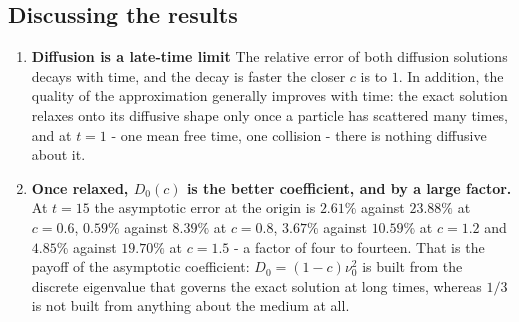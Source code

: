 \documentclass[11pt]{article}
\begin{document}
\subsection*{Discussing the results}
\begin{enumerate}
    \item \textbf{Diffusion is a late-time limit} The relative error of both diffusion solutions decays with time, and the decay is faster the closer $c$ is to $1$.
    In addition, the quality of the approximation generally improves with time: the exact solution relaxes onto its diffusive shape only once a particle has scattered
    many times, and at $t = 1$ - one mean free time, one collision - there is nothing diffusive
    about it.

    \item \textbf{Once relaxed, $D_0(c)$ is the better coefficient, and by a large factor.} At $t = 15$
    the asymptotic error at the origin is $2.61\%$ against $23.88\%$ at $c=0.6$, $0.59\%$ against
    $8.39\%$ at $c=0.8$, $3.67\%$ against $10.59\%$ at $c=1.2$ and $4.85\%$ against $19.70\%$ at
    $c=1.5$ - a factor of four to fourteen. That is the payoff of the asymptotic coefficient:
    $D_0 = (1-c)\nu_0^2$ is built from the discrete eigenvalue that governs the exact solution at long times, whereas
    $1/3$ is not built from anything about the medium at all.
\end{enumerate}
\end{document}
